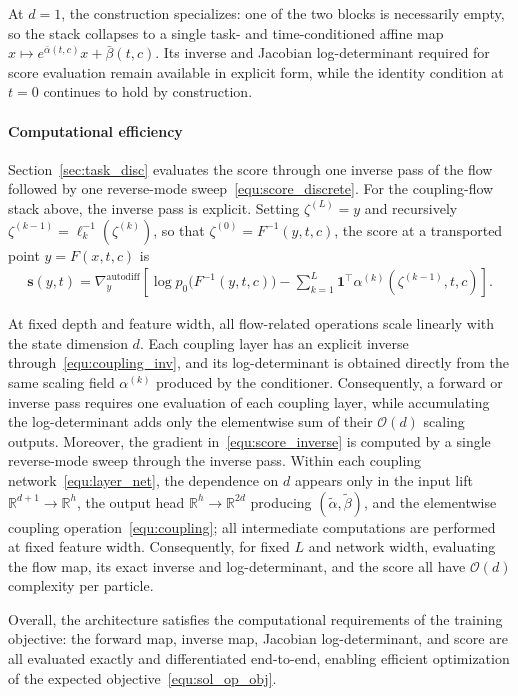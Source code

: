 \documentclass[preprint]{elsarticle}
\newcommand{\R}{\mathbb{R}}
\begin{document}
At $d=1$, the construction specializes: one of the two blocks is necessarily empty, so the stack collapses to a single task- and time-conditioned affine map $x\mapsto e^{\bar\alpha(t,c)}x + \bar\beta(t,c)$. Its inverse and Jacobian log-determinant required for score evaluation remain available in explicit form, while the identity condition at $t=0$ continues to hold by construction.

\paragraph{Computational efficiency} 
Section~\ref{sec:task_disc} evaluates the score through one inverse pass of the flow followed by one reverse-mode sweep~\eqref{equ:score_discrete}. For the coupling-flow stack above, the inverse pass is explicit. Setting $\zeta^{(L)}=y$ and recursively $\zeta^{(k-1)}=\ell_k^{-1}(\zeta^{(k)})$, so that $\zeta^{(0)}=F^{-1}(y,t,c)$, the score at a transported point $y=F(x,t,c)$ is
\begin{align}
\mathbf{s}(y,t)
=
\nabla_y^{\mathrm{autodiff}}
\left[
\log p_0\bigl(F^{-1}(y,t,c)\bigr)
-
\sum_{k=1}^{L}
\mathbf1^\top
\alpha^{(k)}\!\left(\zeta^{(k-1)},t,c\right)
\right].
\label{equ:score_inverse}
\end{align}

At fixed depth and feature width, all flow-related operations scale linearly with the state dimension $d$. Each coupling layer has an explicit inverse through~\eqref{equ:coupling_inv}, and its log-determinant is obtained directly from the same scaling field $\alpha^{(k)}$ produced by the conditioner. Consequently, a forward or inverse pass requires one evaluation of each coupling layer, while accumulating the log-determinant adds only the elementwise sum of their $\mathcal O(d)$ scaling outputs. Moreover, the gradient in~\eqref{equ:score_inverse} is computed by a single reverse-mode sweep through the inverse pass. Within each coupling network~\eqref{equ:layer_net}, the dependence on $d$ appears only in the input lift $\R^{d+1}\to\R^h$, the output head $\R^h\to\R^{2d}$ producing $(\tilde\alpha,\tilde\beta)$, and the elementwise coupling operation~\eqref{equ:coupling}; all intermediate computations are performed at fixed feature width. Consequently, for fixed $L$ and network width, evaluating the flow map, its exact inverse and log-determinant, and the score all have $\mathcal O(d)$ complexity per particle.

Overall, the architecture satisfies the computational requirements of the training objective: the forward map, inverse map, Jacobian log-determinant, and score are all evaluated exactly and differentiated end-to-end, enabling efficient optimization of the expected objective~\eqref{equ:sol_op_obj}.
\end{document}
